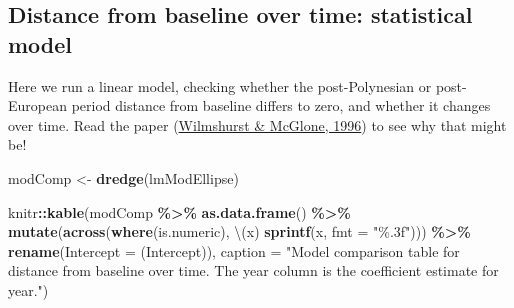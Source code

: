 \documentclass[nofonts,]{tufte-handout}
\newenvironment{Shaded}{\begin{snugshade}}{\end{snugshade}}
\newcommand{\AttributeTok}[1]{\textcolor[rgb]{0.13,0.29,0.53}{#1}}
\newcommand{\FunctionTok}[1]{\textcolor[rgb]{0.13,0.29,0.53}{\textbf{#1}}}
\newcommand{\NormalTok}[1]{#1}
\newcommand{\OtherTok}[1]{\textcolor[rgb]{0.56,0.35,0.01}{#1}}
\newcommand{\SpecialCharTok}[1]{\textcolor[rgb]{0.81,0.36,0.00}{\textbf{#1}}}
\newcommand{\StringTok}[1]{\textcolor[rgb]{0.31,0.60,0.02}{#1}}
\begin{document}
\clearpage

\hypertarget{distance-from-baseline-over-time-statistical-model}{%
\subsection{Distance from baseline over time: statistical
model}\label{distance-from-baseline-over-time-statistical-model}}

Here we run a linear model, checking whether the post-Polynesian or
post-European period distance from baseline differs to zero, and whether
it changes over time. Read the paper
(\protect\hyperlink{ref-wilmshurst_96_forest}{Wilmshurst \& McGlone,
1996}) to see why that might be!

\begin{Shaded}
\end{Shaded}

\begin{Shaded}
\begin{Highlighting}[]
\NormalTok{modComp }\OtherTok{\textless{}{-}} \FunctionTok{dredge}\NormalTok{(lmModEllipse)}

\NormalTok{knitr}\SpecialCharTok{::}\FunctionTok{kable}\NormalTok{(modComp }\SpecialCharTok{\%\textgreater{}\%} 
               \FunctionTok{as.data.frame}\NormalTok{() }\SpecialCharTok{\%\textgreater{}\%}
               \FunctionTok{mutate}\NormalTok{(}\FunctionTok{across}\NormalTok{(}\FunctionTok{where}\NormalTok{(is.numeric), }
\NormalTok{                         \textbackslash{}(x) }\FunctionTok{sprintf}\NormalTok{(x, }
                         \AttributeTok{fmt =} \StringTok{"\%.3f"}\NormalTok{))) }\SpecialCharTok{\%\textgreater{}\%}
               \FunctionTok{rename}\NormalTok{(}\AttributeTok{Intercept =} \StringTok{\textasciigrave{}}\AttributeTok{(Intercept)}\StringTok{\textasciigrave{}}\NormalTok{), }
             \AttributeTok{caption =} \StringTok{"Model comparison table for distance from baseline over time. The year column is the coefficient estimate for year."}\NormalTok{)}
\end{Highlighting}
\end{Shaded}
\end{document}
